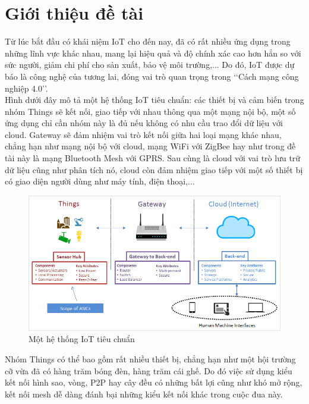 \chapter{Giới thiệu đề tài}
\pagestyle{fancy}
Từ lúc bắt đầu có khái niệm IoT cho đến nay, đã có rất nhiều ứng dụng trong những lĩnh vực khác nhau, mang lại hiệu quả và độ chính xác cao hơn hẳn so với sức người, giảm chi phí cho sản xuất, bảo vệ môi trường,... Do đó, IoT được dự báo là công nghệ của tương lai, đóng vai trò quan trọng trong \lq\lq{}Cách mạng công nghiệp 4.0\rq\rq{}.\\

Hình dưới đây mô tả một hệ thống IoT tiêu chuẩn: các thiết bị và cảm biến trong nhóm Things sẽ kết nối, giao tiếp với nhau thông qua một mạng nội bộ, một số ứng dụng chỉ cần nhóm này là đủ nếu không có nhu cầu trao đổi dữ liệu với cloud. Gateway sẽ đảm nhiệm vai trò kết nối giữa hai loại mạng khác nhau, chẳng hạn như mạng nội bộ với cloud, mạng WiFi với ZigBee hay như trong đề tài này là mạng Bluetooth Mesh với GPRS. Sau cùng là cloud với vai trò lưu trữ dữ liệu cũng như phân tích nó, cloud còn đảm nhiệm giao tiếp với một số thiết bị có giao diện người dùng như máy tính, điện thoại,...

    \begin{figure}[h!]
    	\begin{center}
    		\includegraphics[scale=0.5]{images/internet-of-things-bone.jpg}
    		\caption{Một hệ thống IoT tiêu chuẩn}
    	\end{center}
    \end{figure}

Nhóm Things có thể bao gồm rất nhiều thiết bị, chẳng hạn như một hội trường cỡ vừa đã có hàng trăm bóng đèn, hàng trăm cái ghế. Do đó việc sử dụng kiểu kết nối hình sao, vòng, P2P hay cây đều có những bất lợi cũng như khó mở rộng, kết nối mesh dễ dàng đánh bại những kiểu kết nối khác trong cuộc đua này.\\

